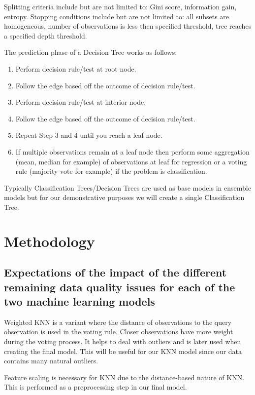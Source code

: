 \documentclass[conference]{IEEEtran}
\begin{document}
Splitting criteria include but are not limited to: Gini score, information gain, entropy. Stopping conditions include but are not limited to: all subsets are homogeneous, number of observations is less then specified threshold, tree reaches a specified depth threshold\cite[p.~11]{info}.

The prediction phase of a Decision Tree works as follows\cite[p.~122]{fundamentals}:

\begin{enumerate}
	\item Perform decision rule/test at root node.
	\item Follow the edge based off the outcome of decision rule/test.
	\item Perform decision rule/test at interior node.
	\item Follow the edge based off the outcome of decision rule/test.
	\item Repeat Step 3 and 4 until you reach a leaf node.
	\item If multiple observations remain at a leaf node then perform some aggregation (mean, median for example) of observations at leaf for regression or a voting rule (majority vote for example) if the problem is classification. 
\end{enumerate}

Typically Classification Trees/Decision Trees are used as base models in ensemble models but for our demonstrative purposes we will create a single Classification Tree.


\section{Methodology}

\subsection{Expectations of the impact of the different remaining data quality issues for each of the two machine learning models}

Weighted KNN is a variant where the distance of observations to the query observation is used in the voting rule. Closer observations have more weight during the voting process. It helps to deal with outliers and is later used when creating the final model. This will be useful for our KNN model since our data contains many natural outliers.

Feature scaling is necessary for KNN due to the distance-based nature of KNN. This is performed as a preprocessing step in our final model.
\end{document}
